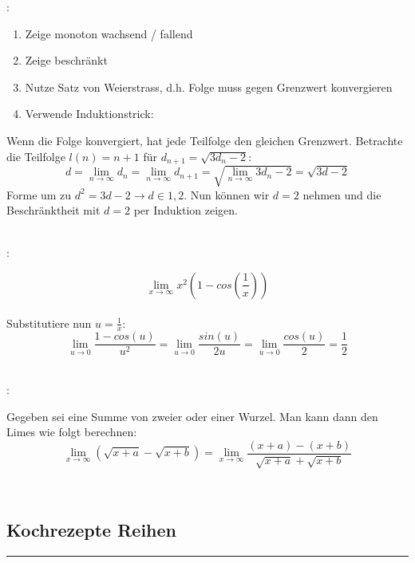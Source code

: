 \documentclass[7pt,landscape, margin = 0.1mm]{article}
\newcommand*{\mysubsection}[1]{\vspace{-2mm}\color{chaptercolor}\subsection{ #1 }
\vspace{-1mm}\hrule\vspace{1.5mm}\color{black}
\vspace{2mm}}
\newcommand{\KRZ}[2]{\vspace{1mm} \hline \vspace{1mm} \color{chaptercolor}{RC #1}:\color{black} \   \hspace{0.2cm}\vspace{1mm}   {\begin{minipage}{20em}
#2 \end{minipage}} \vspace{1mm}  \hline \vspace{1mm}  \\}
\begin{document}
\begin{multicols}{4}
\begin{flushleft}
\KRZ{Induktive Folgen}{\begin{enumerate}
  \item Zeige monoton wachsend / fallend
  \item Zeige beschränkt
  \item Nutze Satz von Weierstrass, d.h. Folge muss gegen Grenzwert konvergieren
  \item Verwende Induktionstrick:
\end{enumerate}
Wenn die Folge konvergiert, hat jede Teilfolge den gleichen Grenzwert. Betrachte die Teilfolge $l(n) = n + 1$ für $d_{n+1} = \sqrt{3d_n - 2}$:
$$d = \lim_{n\to\infty} d_n = \lim_{n\to\infty} d_{n+1} = \sqrt{\lim_{n \to \infty} 3d_n -2} = \sqrt{3d -2}$$
Forme um zu $ d^2 = 3d -2 \to d \in {1,2}$. Nun können wir $d = 2$ nehmen und die Beschränktheit mit $d=2$ per Induktion zeigen.}
\KRZ{Limes Substitution Trick}{$$
  \lim_{x \rightarrow \infty} x^2 (1 - cos(\frac{1}{x}))
$$\\
Substitutiere nun $u = \frac{1}{x}$:
$$
\lim_{u \rightarrow 0} \frac{1 - cos(u)}{u^2} = \lim_{u \rightarrow 0} \frac{sin(u)}{2u} = \lim_{u \rightarrow 0} \frac{cos(u)}{2} = \frac{1}{2}
$$}
\KRZ{Limes Binom Trick}{
Gegeben sei eine Summe von zweier oder einer Wurzel. Man kann dann den Limes wie folgt berechnen:
$$\lim_{x \to \infty }{\left(\sqrt{x+a} - \sqrt{x+b} \right)} = \lim_{x \to \infty } \frac{(x+a)-(x+b)}{\sqrt{x+a} + \sqrt{x+b}}$$
}
\mysubsection{Kochrezepte Reihen}



\end{flushleft}
\end{multicols}
\end{document}
